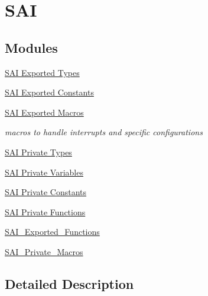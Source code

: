 \hypertarget{group___s_a_i}{}\section{S\+AI}
\label{group___s_a_i}
\subsection*{Modules}
\begin{DoxyCompactItemize}
\item 
\hyperlink{group___s_a_i___exported___types}{S\+A\+I Exported Types}
\item 
\hyperlink{group___s_a_i___exported___constants}{S\+A\+I Exported Constants}
\item 
\hyperlink{group___s_a_i___exported___macros}{S\+A\+I Exported Macros}
\begin{DoxyCompactList}\small\item\em macros to handle interrupts and specific configurations \end{DoxyCompactList}\item 
\hyperlink{group___s_a_i___private___types}{S\+A\+I Private Types}
\item 
\hyperlink{group___s_a_i___private___variables}{S\+A\+I Private Variables}
\item 
\hyperlink{group___s_a_i___private___constants}{S\+A\+I Private Constants}
\item 
\hyperlink{group___s_a_i___private___functions}{S\+A\+I Private Functions}
\item 
\hyperlink{group___s_a_i___exported___functions}{S\+A\+I\+\_\+\+Exported\+\_\+\+Functions}
\item 
\hyperlink{group___s_a_i___private___macros}{S\+A\+I\+\_\+\+Private\+\_\+\+Macros}
\end{DoxyCompactItemize}


\subsection{Detailed Description}

